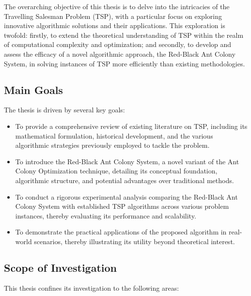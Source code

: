 The overarching objective of this thesis is to delve into the intricacies of the Travelling Salesman Problem (TSP), with a particular focus on exploring innovative algorithmic solutions and their applications. This exploration is twofold: firstly, to extend the theoretical understanding of TSP within the realm of computational complexity and optimization; and secondly, to develop and assess the efficacy of a novel algorithmic approach, the Red-Black Ant Colony System, in solving instances of TSP more efficiently than existing methodologies.

\subsection{Main Goals}

The thesis is driven by several key goals:

\begin{itemize}
    \item To provide a comprehensive review of existing literature on TSP, including its mathematical formulation, historical development, and the various algorithmic strategies previously employed to tackle the problem.
    \item To introduce the Red-Black Ant Colony System, a novel variant of the Ant Colony Optimization technique, detailing its conceptual foundation, algorithmic structure, and potential advantages over traditional methods.
    \item To conduct a rigorous experimental analysis comparing the Red-Black Ant Colony System with established TSP algorithms across various problem instances, thereby evaluating its performance and scalability.
    \item To demonstrate the practical applications of the proposed algorithm in real-world scenarios, thereby illustrating its utility beyond theoretical interest.
\end{itemize}

\subsection{Scope of Investigation}

This thesis confines its investigation to the following areas:

